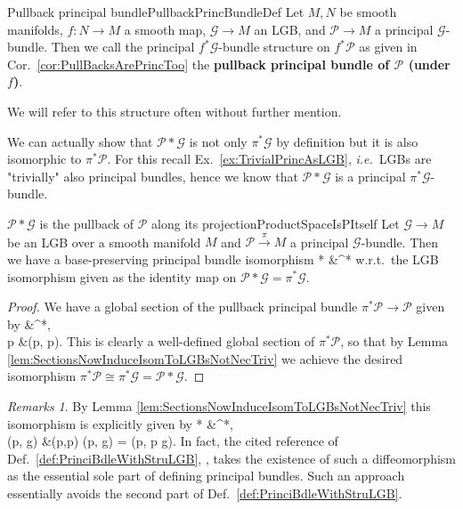 \documentclass[a4paper,oneside,11pt,bibliography=totoc]{scrartcl}
\def\bas#1\eas{\begin{align*}#1\end{align*}}
\theoremstyle{plain}
\theoremstyle{remark}
\newtheorem{remark}[theorem]{Remarks}
\theoremstyle{definition}
\begin{document}
\begin{definitions}{Pullback principal bundle}{PullbackPrincBundleDef}
Let $M, N$ be smooth manifolds, $f: N \to M$ a smooth map, $\mathcal{G} \to M$ an LGB, and $\mathcal{P} \to M$ a principal $\mathcal{G}$-bundle. Then we call the principal $f^*\mathcal{G}$-bundle structure on $f^*\mathcal{P}$ as given in Cor.\ \ref{cor:PullBacksArePrincToo} the \textbf{pullback principal bundle of $\mathcal{P}$ (under $f$)}.

We will refer to this structure often without further mention.
\end{definitions}

We can actually show that $\mathcal{P}*\mathcal{G}$ is not only $\pi^*\mathcal{G}$ by definition but it is also isomorphic to $\pi^*\mathcal{P}$. For this recall Ex.\ \ref{ex:TrivialPrincAsLGB}, \textit{i.e.}\ LGBs are "trivially" also principal bundles, hence we know that $\mathcal{P} * \mathcal{G}$ is a principal $\pi^*\mathcal{G}$-bundle.

\begin{corollaries}{$\mathcal{P}*\mathcal{G}$ is the pullback of $\mathcal{P}$ along its projection}{ProductSpaceIsPItself}
Let $\mathcal{G} \to M$ be an LGB over a smooth manifold $M$ and $\mathcal{P} \stackrel{\pi}{\to} M$ a principal $\mathcal{G}$-bundle. Then we have a base-preserving principal bundle isomorphism 
\bas
\mathcal{P}* &\cong \pi^*
\eas
w.r.t.\ the LGB isomorphism given as the identity map on $\mathcal{P} * \mathcal{G} = \pi^*\mathcal{G}$.
\end{corollaries}

\begin{proof}
\leavevmode\newline
We have a global section of the pullback principal bundle $\pi^*\mathcal{P} \to \mathcal{P}$ given by
\bas
\mathcal{P} &\to \pi^*,\\
p &\mapsto (p, p).
\eas
This is clearly a well-defined global section of $\pi^*\mathcal{P}$, so that by Lemma \ref{lem:SectionsNowInduceIsomToLGBsNotNecTriv} we achieve the desired isomorphism $\pi^*\mathcal{P} \cong \pi^*\mathcal{G} = \mathcal{P} * \mathcal{G}$.
\end{proof}

\begin{remark}\label{AlternativePrincBdlDef}
\leavevmode\newline
By Lemma \ref{lem:SectionsNowInduceIsomToLGBsNotNecTriv} this isomorphism is explicitly given by
\bas
\mathcal{P}* &\to \pi^*,\\
(p, g) &\mapsto (p,p) \cdot (p, g) = (p, p \cdot g).
\eas
In fact, the cited reference of Def.\ \ref{def:PrinciBdleWithStruLGB}, \cite[simplification of the beginning of \S 5.7, page 144f.]{GroupoidBasedPrincipalBundles}, takes the existence of such a diffeomorphism as the essential sole part of defining principal bundles. Such an approach essentially avoids the second part of Def.\ \ref{def:PrinciBdleWithStruLGB}.
\end{remark}
\end{document}
